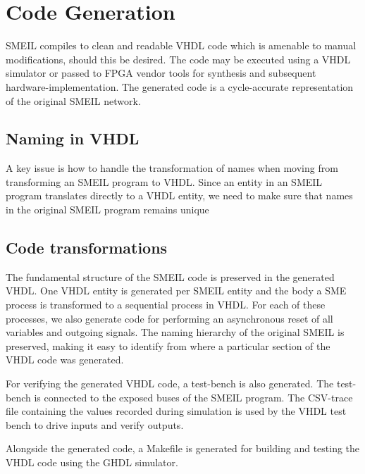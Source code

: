 \chapter{Code Generation}
\label{sec:codegen}
SMEIL compiles to clean and readable VHDL code which is amenable to manual
modifications, should this be desired. The code may be executed using a VHDL
simulator or passed to FPGA vendor tools for synthesis and subsequent
hardware-implementation. The generated code is a cycle-accurate representation
of the original SMEIL network.

\section{Naming in VHDL}
A key issue is how to handle the transformation of names when moving from
transforming an SMEIL program to VHDL. Since an entity in an SMEIL program
translates directly to a VHDL entity, we need to make sure that names in the
original SMEIL program remains unique

\section{Code transformations}

The fundamental structure of the SMEIL code is preserved in the generated
VHDL. One VHDL entity is generated per SMEIL entity and the body a SME process
is transformed to a sequential process in VHDL. For each of these processes, we
also generate code for performing an asynchronous reset of all variables and
outgoing signals. The naming hierarchy of the original SMEIL is preserved,
making it easy to identify from where a particular section of the VHDL code was
generated.

For verifying the generated VHDL code, a test-bench is also generated. The
test-bench is connected to the {\ttfamily exposed} buses of the SMEIL program. The
CSV-trace file containing the values recorded during simulation is used by the
VHDL test bench to drive inputs and verify outputs.

Alongside the generated code, a {\ttfamily Makefile} is generated for building
and testing the VHDL code using the GHDL simulator.

